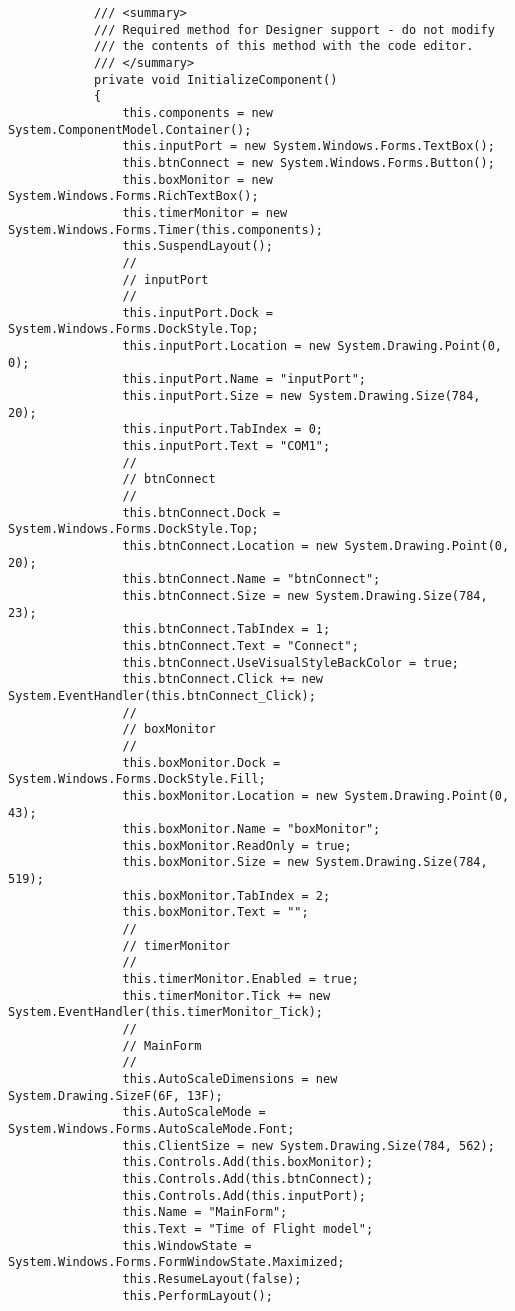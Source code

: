 \begin{verbatim}
            /// <summary>
            /// Required method for Designer support - do not modify
            /// the contents of this method with the code editor.
            /// </summary>
            private void InitializeComponent()
            {
                this.components = new System.ComponentModel.Container();
                this.inputPort = new System.Windows.Forms.TextBox();
                this.btnConnect = new System.Windows.Forms.Button();
                this.boxMonitor = new System.Windows.Forms.RichTextBox();
                this.timerMonitor = new System.Windows.Forms.Timer(this.components);
                this.SuspendLayout();
                // 
                // inputPort
                // 
                this.inputPort.Dock = System.Windows.Forms.DockStyle.Top;
                this.inputPort.Location = new System.Drawing.Point(0, 0);
                this.inputPort.Name = "inputPort";
                this.inputPort.Size = new System.Drawing.Size(784, 20);
                this.inputPort.TabIndex = 0;
                this.inputPort.Text = "COM1";
                // 
                // btnConnect
                // 
                this.btnConnect.Dock = System.Windows.Forms.DockStyle.Top;
                this.btnConnect.Location = new System.Drawing.Point(0, 20);
                this.btnConnect.Name = "btnConnect";
                this.btnConnect.Size = new System.Drawing.Size(784, 23);
                this.btnConnect.TabIndex = 1;
                this.btnConnect.Text = "Connect";
                this.btnConnect.UseVisualStyleBackColor = true;
                this.btnConnect.Click += new System.EventHandler(this.btnConnect_Click);
                // 
                // boxMonitor
                // 
                this.boxMonitor.Dock = System.Windows.Forms.DockStyle.Fill;
                this.boxMonitor.Location = new System.Drawing.Point(0, 43);
                this.boxMonitor.Name = "boxMonitor";
                this.boxMonitor.ReadOnly = true;
                this.boxMonitor.Size = new System.Drawing.Size(784, 519);
                this.boxMonitor.TabIndex = 2;
                this.boxMonitor.Text = "";
                // 
                // timerMonitor
                // 
                this.timerMonitor.Enabled = true;
                this.timerMonitor.Tick += new System.EventHandler(this.timerMonitor_Tick);
                // 
                // MainForm
                // 
                this.AutoScaleDimensions = new System.Drawing.SizeF(6F, 13F);
                this.AutoScaleMode = System.Windows.Forms.AutoScaleMode.Font;
                this.ClientSize = new System.Drawing.Size(784, 562);
                this.Controls.Add(this.boxMonitor);
                this.Controls.Add(this.btnConnect);
                this.Controls.Add(this.inputPort);
                this.Name = "MainForm";
                this.Text = "Time of Flight model";
                this.WindowState = System.Windows.Forms.FormWindowState.Maximized;
                this.ResumeLayout(false);
                this.PerformLayout();


\end{verbatim}

